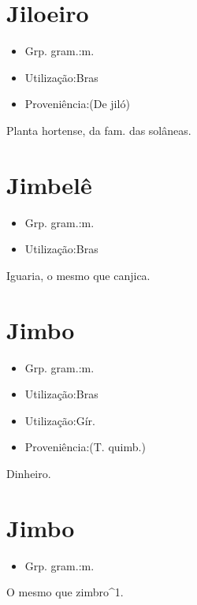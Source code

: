 \documentclass{article}
\begin{document}
\section{Jiloeiro}
\begin{itemize}
\item {Grp. gram.:m.}
\end{itemize}
\begin{itemize}
\item {Utilização:Bras}
\end{itemize}
\begin{itemize}
\item {Proveniência:(De \textunderscore jiló\textunderscore )}
\end{itemize}
Planta hortense, da fam. das solâneas.
\section{Jimbelê}
\begin{itemize}
\item {Grp. gram.:m.}
\end{itemize}
\begin{itemize}
\item {Utilização:Bras}
\end{itemize}
Iguaria, o mesmo que \textunderscore canjica\textunderscore .
\section{Jimbo}
\begin{itemize}
\item {Grp. gram.:m.}
\end{itemize}
\begin{itemize}
\item {Utilização:Bras}
\end{itemize}
\begin{itemize}
\item {Utilização:Gír.}
\end{itemize}
\begin{itemize}
\item {Proveniência:(T. quimb.)}
\end{itemize}
Dinheiro.
\section{Jimbo}
\begin{itemize}
\item {Grp. gram.:m.}
\end{itemize}
O mesmo que \textunderscore zimbro\textunderscore ^1.
\end{document}
